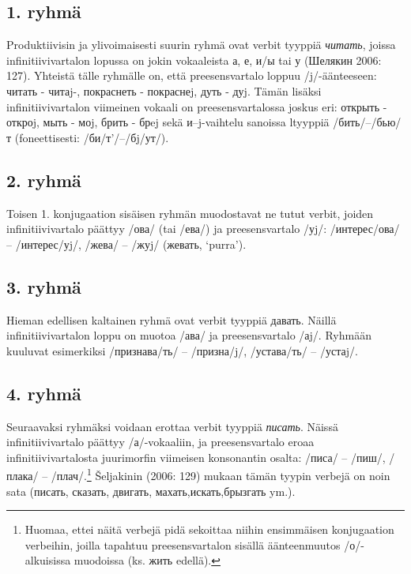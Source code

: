 \documentclass[]{scrreprt}
\begin{document}
\subsection{1. ryhmä}\label{ryhmuxe4}

Produktiivisin ja ylivoimaisesti suurin ryhmä ovat verbit tyyppiä
\emph{читать}, joissa infinitiivivartalon lopussa on jokin vokaaleista
а, е, и/ы tai у (Шелякин 2006: 127). Yhteistä tälle ryhmälle on, että
preesensvartalo loppuu /j/-äänteeseen: читать - читаj-, покраснеть -
покраснеj, дуть - дуj. Tämän lisäksi infinitiivivartalon viimeinen
vokaali on preesensvartalossa joskus eri: открыть - откроj, мыть - моj,
брить - брej sekä и--j-vaihtelu sanoissa ltyyppiä /бить/--/бью/т
(foneettisesti: /би/т'/--/бj/ут/).

\subsection{2. ryhmä}\label{ryhmuxe4-1}

Toisen 1. konjugaation sisäisen ryhmän muodostavat ne tutut verbit,
joiden infinitiivivartalo päättyy /ова/ (tai /ева/) ja preesensvartalo
/уj/: /интерес/ова/ -- /интерес/уj/, /жева/ -- /жуj/ (жевать, `purra').

\subsection{3. ryhmä}\label{ryhmuxe4-2}

Hieman edellisen kaltainen ryhmä ovat verbit tyyppiä давать. Näillä
infinitiivivartalon loppu on muotoa /ава/ ja preesensvartalo /аj/.
Ryhmään kuuluvat esimerkiksi /признава/ть/ -- /призна/j/, /устава/ть/ --
/устаj/.

\subsection{4. ryhmä}\label{ryhmuxe4-3}

Seuraavaksi ryhmäksi voidaan erottaa verbit tyyppiä \emph{писать}.
Näissä infinitiivivartalo päättyy /а/-vokaaliin, ja preesensvartalo
eroaa infinitiivivartalosta juurimorfin viimeisen konsonantin osalta:
/писа/ -- /пиш/, /плака/ -- /плач/.\footnote{Huomaa, ettei näitä verbejä
  pidä sekoittaa niihin ensimmäisen konjugaation verbeihin, joilla
  tapahtuu preesensvartalon sisällä äänteenmuutos /о/-alkuisissa
  muodoissa (ks. жить edellä).} Šeljakinin (2006: 129) mukaan tämän
tyypin verbejä on noin sata (писать, сказать, двигать,
махать,искать,брызгать ym.).
\end{document}
